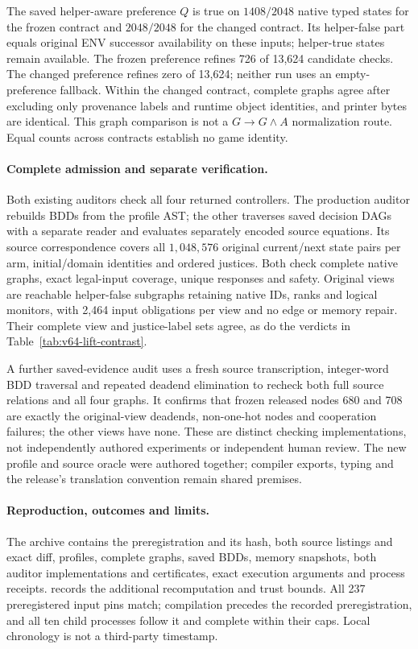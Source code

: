 The saved helper-aware preference $Q$ is true on $1408/2048$ native typed
states for the frozen contract and $2048/2048$ for the changed contract.
Its helper-false part equals original ENV successor availability on these
inputs; helper-true states remain available. The frozen preference refines
726 of 13,624 candidate checks. The changed preference refines zero of
13,624; neither run uses an empty-preference fallback.
Within the changed contract, complete graphs agree after excluding only
provenance labels and runtime object identities, and printer bytes are
identical. This graph comparison is not a $G\to G\land A$ normalization
route. Equal counts across contracts establish no game identity.

\paragraph{Complete admission and separate verification.}
Both existing auditors check all four returned controllers. The production
auditor rebuilds BDDs from the profile AST; the other traverses saved
decision DAGs with a separate reader and evaluates separately encoded
source equations. Its source correspondence covers all $1{,}048{,}576$
original current/next state pairs per arm, initial/domain identities and
ordered justices. Both check complete native graphs, exact legal-input
coverage, unique responses and safety. Original views are reachable
helper-false subgraphs retaining native IDs, ranks and logical monitors,
with 2,464 input obligations per view and no edge or memory repair.
Their complete view and justice-label sets agree, as do the verdicts in
Table~\ref{tab:v64-lift-contrast}.

A further saved-evidence audit uses a fresh source transcription,
integer-word BDD traversal and repeated deadend elimination to recheck
both full source relations and all four graphs. It confirms that frozen
released nodes 680 and 708 are exactly the original-view deadends,
non-one-hot nodes and cooperation failures; the other views have none.
These are distinct checking implementations, not independently authored
experiments or independent human review. The new profile and source oracle
were authored together; compiler exports, typing and the release's
translation convention remain shared premises.

\paragraph{Reproduction, outcomes and limits.}
The archive  contains the
preregistration and its hash, both source listings and exact diff,
profiles, complete graphs, saved BDDs, memory snapshots, both auditor
implementations and certificates, exact execution arguments and process
receipts.  records the
additional recomputation and trust bounds. All 237 preregistered input
pins match; compilation precedes the recorded preregistration, and all
ten child processes follow it and complete within their caps.
Local chronology is not a third-party timestamp.


